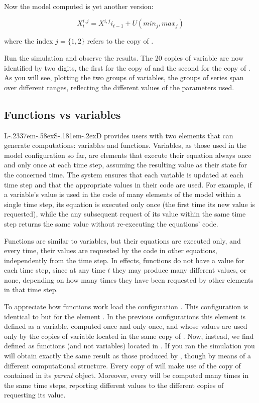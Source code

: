 \documentclass [11pt,a4paper] {book}
\def\LsD{{L\kern-.2337em\lower-.58ex\hbox{S}\kern-.181em\lower-.2ex\hbox{D}}\xspace}
\begin{document}
Now the model computed is yet another version:

\[
X^{i,j}_t=X^{i,j}i_{t-1} + U(min_j, max_j)
\]

where the index $j=\{1,2\}$ refers to the copy of .

Run the simulation and observe the results. The 20 copies of variable  are now identified by two digits, the first for the copy of  and the second for the copy of . As you will see, plotting the two groups of variables, the groups of series span over different ranges, reflecting the different values of the parameters used.




\subsection{Functions vs variables}
\LsD provides users with two elements that can generate computations: variables and functions. Variables, as those used in the model configuration so far, are elements that execute their equation always once and only once at each time step, assuming the resulting value as their state for the concerned time. The system ensures that each variable is updated at each time step and that the appropriate values in their code are used. For example, if a variable's value is used in the code of many elements of the model within a single time step, its equation is executed only once (the first time its new value is requested), while the any subsequent request of its value within the same time step returns the same value without re-executing the equations' code. 

Functions are similar to variables, but their equations are executed only, and every time, their values are requested by the code in other equations, independently from the time step. In effects, functions do not have a value for each time step, since at any time $t$ they may produce many different values, or none, depending on how many times they have been requested by other elements in that time step. 


To appreciate how functions work load the configuration . This configuration is identical to  but for the element . In the previous configurations  this element is defined as a variable, computed once and only once, and whose values are used only by the copies of variable  located in the same copy of . Now, instead, we find  defined as functions (and not variables) located in . If you ran the simulation you will obtain exactly the same result as those produced by , though by means of a different computational structure. Every copy of  will make use of the copy of  contained in its \textit{parent} object. Moreover, every  will be computed many times in the same time steps, reporting different values to the different copies of  requesting its value.
\end{document}
